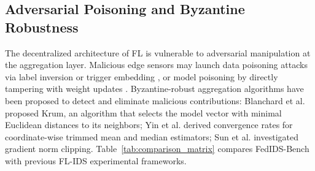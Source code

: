 \documentclass[conference]{IEEEtran}
\begin{document}
\subsection{Adversarial Poisoning and Byzantine Robustness}
The decentralized architecture of FL is vulnerable to adversarial manipulation at the aggregation layer. Malicious edge sensors may launch data poisoning attacks via label inversion or trigger embedding \cite{bagdasaryan2020backdoor, tolpegin2020data}, or model poisoning by directly tampering with weight updates \cite{bhagoji2019analyzing, fang2020local}. Byzantine-robust aggregation algorithms have been proposed to detect and eliminate malicious contributions: Blanchard et al. \cite{blanchard2017machine} proposed Krum, an algorithm that selects the model vector with minimal Euclidean distances to its neighbors; Yin et al. \cite{yin2018byzantine} derived convergence rates for coordinate-wise trimmed mean and median estimators; Sun et al. \cite{sun2019can} investigated gradient norm clipping. Table~\ref{tab:comparison_matrix} compares FedIDS-Bench with previous FL-IDS experimental frameworks.

\begin{table}[t]
\caption{Systematic Methodological Comparison: Prior FL-IDS Studies vs. FedIDS-Bench}
\label{tab:comparison_matrix}
\centering
{}
\end{table}
\end{document}
